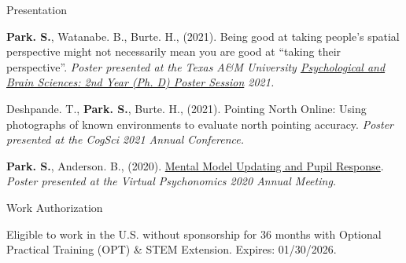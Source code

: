 \documentclass{resume} %
\begin{document}
\begin{rSection}{Presentation}
\begin{hangingpar}
	\end{hangingpar}

    \begin{hangingpar}
        
        \textbf{Park. S.}, Watanabe. B., Burte. H., (2021). 
        Being good at taking people's spatial perspective might not necessarily 
        mean you are good at “taking their perspective”. 
        \em{Poster presented at the Texas A\&M University
            \href{https://sites.google.com/tamu.edu/2021-2nd-year-poster/home}{Psychological
             and Brain Sciences: 2nd Year (Ph. D) Poster Session} 2021.}
        
    \end{hangingpar}
	
	\begin{hangingpar}
		
		 Deshpande. T., \textbf{Park. S.}, Burte. H., (2021). 
		 Pointing North Online: Using photographs of known environments to 
		 evaluate north pointing accuracy. 
		 \em{Poster presented at the CogSci 2021 Annual Conference.}
		
	\end{hangingpar}

	\begin{hangingpar}
		
		\textbf{Park. S.}, Anderson. B., (2020). \href{https://brittlab.uwaterloo.ca/2021/01/07/sungjoon-presents-psychonomics/}
		{Mental Model Updating and Pupil Response}. 
		\em{Poster presented at the Virtual Psychonomics 2020 Annual Meeting.}
		
	\end{hangingpar}
	
\end{rSection}


\begin{rSection}{Work Authorization}
    
    Eligible to work in the U.S. without sponsorship for 36 months with 
    Optional Practical Training (OPT) \& STEM Extension. Expires: 01/30/2026.
    
\end{rSection}
\end{document}
